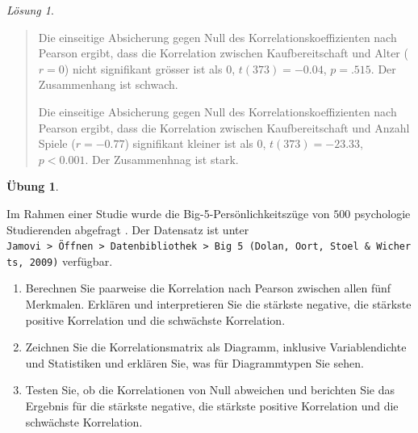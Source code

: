 \documentclass[
]{book}
\providecommand{\tightlist}{%
  \setlength{\itemsep}{0pt}\setlength{\parskip}{0pt}}
\theoremstyle{definition}
\theoremstyle{definition}
\theoremstyle{definition}
\newtheorem{exercise}{Übung}[chapter]
\theoremstyle{definition}
\theoremstyle{remark}
\newtheorem*{solution}{Lösung}
\begin{document}
\begin{solution}
\leavevmode

\begin{quote}
Die einseitige Absicherung gegen Null des Korrelationskoeffizienten nach Pearson ergibt, dass die Korrelation zwischen Kaufbereitschaft und Alter (\(r = 0\)) nicht signifikant grösser ist als \(0\), \(t(373) = -0.04\), \(p = .515\). Der Zusammenhang ist schwach.

Die einseitige Absicherung gegen Null des Korrelationskoeffizienten nach Pearson ergibt, dass die Korrelation zwischen Kaufbereitschaft und Anzahl Spiele (\(r = -0.77\)) signifikant kleiner ist als \(0\), \(t(373) = -23.33\), \(p < 0.001\). Der Zusammenhnag ist stark.
\end{quote}

\end{solution}

\begin{exercise}
\protect\hypertarget{exr:big-five-cor}{}\label{exr:big-five-cor}\leavevmode

Im Rahmen einer Studie wurde die Big-5-Persönlichkeitszüge von \(500\) psychologie Studierenden abgefragt \citep{dolan2009}. Der Datensatz ist unter \texttt{Jamovi\ \textgreater{}\ Öffnen\ \textgreater{}\ Datenbibliothek\ \textgreater{}\ Big\ 5\ (Dolan,\ Oort,\ Stoel\ \&\ Wicherts,\ 2009)} verfügbar.

\begin{enumerate}
\def\labelenumi{\alph{enumi})}
\tightlist
\item
  Berechnen Sie paarweise die Korrelation nach Pearson zwischen allen fünf Merkmalen. Erklären und interpretieren Sie die stärkste negative, die stärkste positive Korrelation und die schwächste Korrelation.
\item
  Zeichnen Sie die Korrelationsmatrix als Diagramm, inklusive Variablendichte und Statistiken und erklären Sie, was für Diagrammtypen Sie sehen.
\item
  Testen Sie, ob die Korrelationen von Null abweichen und berichten Sie das Ergebnis für die stärkste negative, die stärkste positive Korrelation und die schwächste Korrelation.
\end{enumerate}

\end{exercise}
\end{document}
